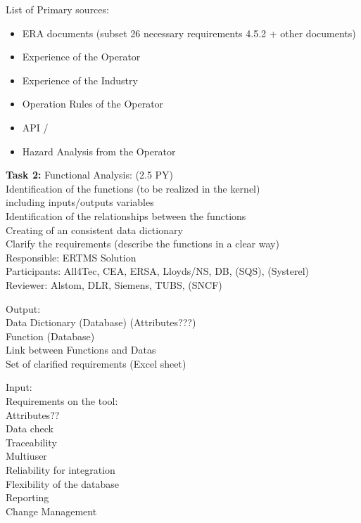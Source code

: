 \documentclass{template/openetcs_article}
\begin{document}
List of Primary sources:
\begin{itemize}
\item ERA documents (subset 26 necessary requirements 4.5.2 + other documents)
\item Experience of the Operator 
\item Experience of the Industry
\item Operation Rules of the Operator
\item API /
\item Hazard Analysis from the Operator
\end{itemize}
\textbf{Task 2:} Functional Analysis: (2.5 PY)\\
Identification of the functions (to be realized in the kernel)\\ including inputs/outputs variables\\
Identification of the relationships between the functions\\
Creating of an consistent data dictionary\\
Clarify the requirements (describe the functions in a clear way)\\
Responsible: ERTMS Solution\\
Participants: All4Tec, CEA, ERSA, Lloyds/NS, DB, (SQS), (Systerel)\\
Reviewer: Alstom, DLR, Siemens, TUBS, (SNCF)

Output:\\
\hspace*{10mm}Data Dictionary (Database) (Attributes???)\\
\hspace*{10mm}Function (Database)\\
\hspace*{10mm}Link between Functions and Datas\\
\hspace*{10mm}Set of clarified requirements (Excel sheet)


Input: \\
\hspace*{10mm}Requirements on the tool:\\
\hspace*{10mm}Attributes??\\
\hspace*{10mm}Data check\\
\hspace*{10mm}Traceability\\
\hspace*{10mm}Multiuser\\
\hspace*{10mm}Reliability for integration\\
\hspace*{10mm}Flexibility of the database\\
\hspace*{10mm}Reporting\\
\hspace*{10mm}Change Management
\end{document}
